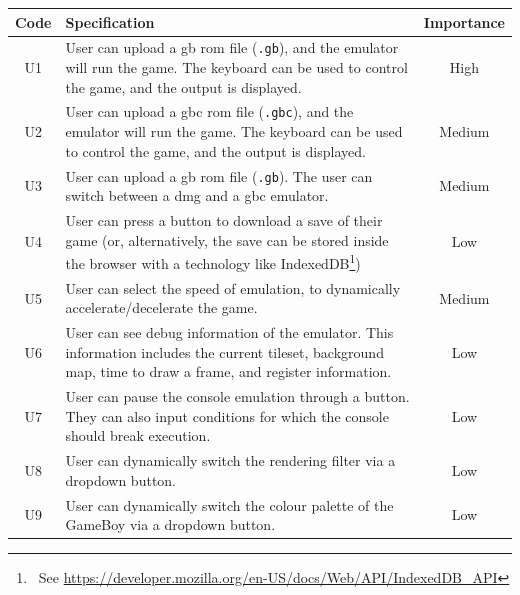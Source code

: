 \documentclass[11pt]{report}
\newcommand{\ftnt}[1]{\footnote{~See \url{#1}}}
\begin{document}
\begin{xltabular}{\textwidth}{|c|X|c|}
    \hline
    \textbf{Code} & \textbf{Specification} & \textbf{Importance}\\
    \hline\hline
    \endhead

    U1 & User can upload a \gls{gb} \gls{rom} file (\texttt{.gb}), and the emulator will run the game. The keyboard can be used to control the game, and the output is displayed. & High \\ \hline
    U2 & User can upload a \gls{gbc} \gls{rom} file (\texttt{.gbc}), and the emulator will run the game. The keyboard can be used to control the game, and the output is displayed. & Medium \\ \hline
    U3 & User can upload a \gls{gb} \gls{rom} file (\texttt{.gb}). The user can switch between a \gls{dmg} and a \gls{gbc} emulator. & Medium \\ \hline
    U4 & User can press a button to download a save of their game (or, alternatively, the save can be stored inside the browser with a technology like IndexedDB\ftnt{https://developer.mozilla.org/en-US/docs/Web/API/IndexedDB_API}) & Low \\ \hline
    U5 & User can select the speed of emulation, to dynamically accelerate/decelerate the game. & Medium \\ \hline
    U6 & User can see debug information of the emulator. This information includes the current tileset, background map, time to draw a frame, and register information. & Low \\ \hline
    U7 & User can pause the console emulation through a button. They can also input conditions for which the console should break execution. & Low \\ \hline
    U8 & User can dynamically switch the rendering filter via a dropdown button. & Low \\ \hline
    U9 & User can dynamically switch the colour palette of the GameBoy via a dropdown button. & Low \\ \hline


\end{xltabular}
\end{document}
